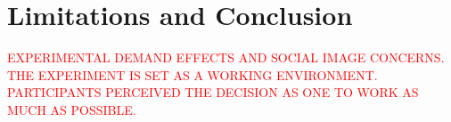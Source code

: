 \documentclass[11pt,a4paper,oneside]{article}
\begin{document}
\section{Limitations and Conclusion}

\textcolor{red}{EXPERIMENTAL DEMAND EFFECTS AND SOCIAL IMAGE CONCERNS. THE EXPERIMENT IS SET AS A WORKING ENVIRONMENT. PARTICIPANTS PERCEIVED THE DECISION AS ONE TO WORK AS MUCH AS POSSIBLE.}










 
\end{document}
